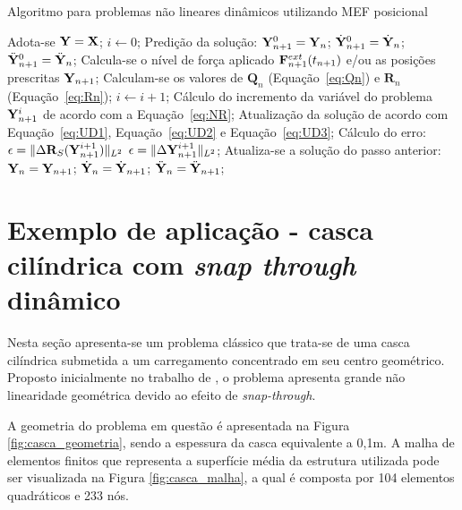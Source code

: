 \begin{algorithm}[H]
	\caption{Algoritmo para problemas não lineares dinâmicos utilizando MEF posicional}
	\label{alg:algoritmo_solid}
	\begin{algorithmic}[1]
		\State Adota-se $\mathbf{Y} = \mathbf{X}$;
		\State $i \gets 0$;
		\State Predição da solução:
		\State $\mathbf{Y}_{n+1}^{0} = \mathbf{Y}_{n}$;
		\State $\dot{\mathbf{Y}}_{n+1}^{0} = \dot{\mathbf{Y}}_{n}$;
		\State $\ddot{\mathbf{Y}}_{n+1}^{0} = \ddot{\mathbf{Y}}_{n}$;
		\State Calcula-se o nível de força aplicado $\mathbf{F}^{ext}_{n+1}(t_{n+1})$ e/ou as posições prescritas $\mathbf{Y}_{n+1}$;
		\State Calculam-se os valores de $\mathbf{Q}_n$ (Equação~\eqref{eq:Qn}) e $\mathbf{R}_n$ (Equação~\eqref{eq:Rn});
		\State $i \gets i + 1$;
		\State Cálculo do incremento da variável do problema $\mathbf{Y}_{n+1}^{i}$ de acordo com a Equação~\eqref{eq:NR};
		\State Atualização da solução de acordo com Equação~\eqref{eq:UD1}, Equação~\eqref{eq:UD2} e Equação~\eqref{eq:UD3};
		\State Cálculo do erro:
		\State $\epsilon = \lVert \Delta\mathbf{R}_S(\mathbf{Y}_{n+1}^{i+1}) \rVert_{L^2}$  $\epsilon = \lVert \Delta\mathbf{Y}_{n+1}^{i+1} \rVert_{L^2}$;
		\EndWhile
		\State Atualiza-se a solução do passo anterior:
		\State $\mathbf{Y}_{n} = \mathbf{Y}_{n+1}$;
		\State $\dot{\mathbf{Y}}_{n} = \dot{\mathbf{Y}}_{n+1}$;
		\State $\ddot{\mathbf{Y}}_{n} = \ddot{\mathbf{Y}}_{n+1}$;
		\EndFor
	\end{algorithmic}
\end{algorithm}

\section{Exemplo de aplicação - casca cilíndrica com \textit{snap through} dinâmico}

Nesta seção apresenta-se um problema clássico que trata-se de uma casca cilíndrica submetida a um carregamento concentrado em seu centro geométrico. Proposto inicialmente no trabalho de 
, o problema apresenta grande não linearidade geométrica devido ao efeito de \textit{snap-through}. 

A geometria do problema em questão é apresentada na Figura \ref{fig:casca_geometria}, sendo a espessura da casca equivalente a 0,1m.  A malha de elementos finitos que representa a superfície média da estrutura utilizada pode ser visualizada na Figura \ref{fig:casca_malha}, a qual é composta por 104 elementos quadráticos e 233 nós. 


